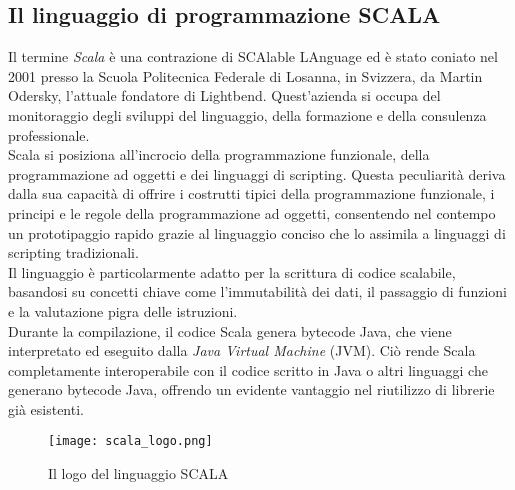 \subsection[SCALA]{Il linguaggio di programmazione SCALA}
Il termine \textit{Scala} è una contrazione di SCAlable LAnguage ed è stato coniato nel 2001 presso la Scuola Politecnica Federale di Losanna, in Svizzera, da Martin Odersky, l'attuale fondatore di Lightbend.
Quest'azienda si occupa del monitoraggio degli sviluppi del linguaggio, della formazione e della consulenza professionale. \\
Scala si posiziona all'incrocio della programmazione funzionale, della programmazione ad oggetti e dei linguaggi di scripting.
Questa peculiarità deriva dalla sua capacità di offrire i costrutti tipici della programmazione funzionale, i principi e le regole della programmazione ad oggetti, consentendo nel contempo un prototipaggio rapido grazie al linguaggio conciso che lo assimila a linguaggi di scripting tradizionali. \\
Il linguaggio è particolarmente adatto per la scrittura di codice scalabile, basandosi su concetti chiave come l'immutabilità dei dati, il passaggio di funzioni e la valutazione pigra delle istruzioni. \\
Durante la compilazione, il codice Scala genera bytecode Java, che viene interpretato ed eseguito dalla \textit{Java Virtual Machine} (JVM).
Ciò rende Scala completamente interoperabile con il codice scritto in Java o altri linguaggi che generano bytecode Java, offrendo un evidente vantaggio nel riutilizzo di librerie già esistenti. 

\begin{figure}[!ht]
  \centering
  \texttt{[image: scala\_logo.png]}
  \caption[SCALA Logo]{Il logo del linguaggio SCALA \cite{scala}}
\end{figure}

